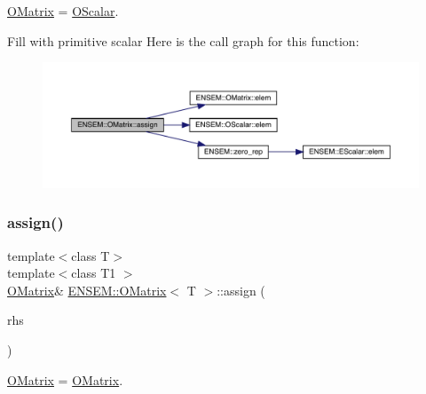 \mbox{\hyperlink{classENSEM_1_1OMatrix}{O\+Matrix}} = \mbox{\hyperlink{classENSEM_1_1OScalar}{O\+Scalar}}. 

Fill with primitive scalar Here is the call graph for this function\+:
\nopagebreak
\begin{figure}[H]
\begin{center}
\leavevmode
\includegraphics[width=350pt]{dd/d80/classENSEM_1_1OMatrix_af0aaac940f907eb3db104e9f57b90a4f_cgraph}
\end{center}
\end{figure}
\mbox{\label{classENSEM_1_1OMatrix_a37ed216c9ecfe42f7a357573699b3bfc}} 
\subsubsection{\texorpdfstring{assign()}{assign()}\hspace{0.1cm}{\footnotesize\ttfamily [5/6]}}
{\footnotesize\ttfamily template$<$class T$>$ \\
template$<$class T1 $>$ \\
\mbox{\hyperlink{classENSEM_1_1OMatrix}{O\+Matrix}}\& \mbox{\hyperlink{classENSEM_1_1OMatrix}{E\+N\+S\+E\+M\+::\+O\+Matrix}}$<$ T $>$\+::assign (\begin{DoxyParamCaption}\item[{const \mbox{\hyperlink{classENSEM_1_1OMatrix}{O\+Matrix}}$<$ T1 $>$ \&}]{rhs }\end{DoxyParamCaption})\hspace{0.3cm}{\ttfamily [inline]}}



\mbox{\hyperlink{classENSEM_1_1OMatrix}{O\+Matrix}} = \mbox{\hyperlink{classENSEM_1_1OMatrix}{O\+Matrix}}. 

